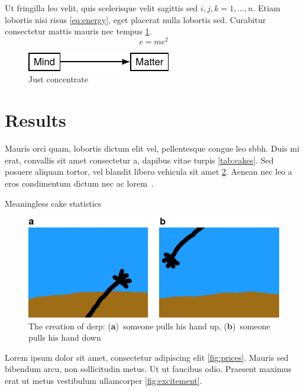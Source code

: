 \documentclass[12pt]{article}
\begin{document}
Ut fringilla leo velit, quis scelerisque velit sagittis sed \( i,j,k=1,\dotsc,n \). Etiam lobortis nisi risus \cref{eq:energy}, eget placerat nulla lobortis sed. Curabitur consectetur mattis mauris nec tempus \cref{fig:mind-to-matter}.
%
\begin{equation}\label{eq:energy}
	e = m c^2
\end{equation}

\begin{figure}
	\centering
	\includegraphics{mind-to-matter}
	\caption{Just concentrate}%
	\label{fig:mind-to-matter}
\end{figure}

\section{Results}

Mauris orci quam, lobortis dictum elit vel, pellentesque congue leo \gls{sbbh}. Duis mi erat, convallis sit amet consectetur a, dapibus vitae turpis \cref{tab:cakes}. Sed posuere aliquam tortor, vel blandit libero vehicula sit amet \cref{fig:adam}. Aenean nec leo a eros condimentum dictum nec ac lorem~\autocite{Einstein1935,Hawking1975}.

\begin{table}
	\centering
	\caption{Meaningless cake statistics}%
	\label{tab:cakes}
\end{table}

\begin{figure}
	\centering
	\includegraphics{adam}
	\caption{The creation of derp: (\textbf{a})~someone pulls his hand up, (\textbf{b})~someone pulls his hand down}%
	\label{fig:adam}
\end{figure}

Lorem ipsum dolor sit amet, consectetur adipiscing elit \cref{fig:prices}. Mauris sed bibendum arcu, non sollicitudin metus. Ut ut faucibus odio. Praesent maximus erat ut metus vestibulum ullamcorper \cref{fig:excitement}.
\end{document}
